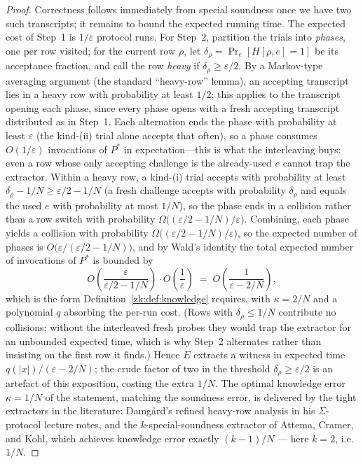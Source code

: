 \documentclass[11pt,a4paper]{article}
\theoremstyle{definition}
\theoremstyle{remark}
\begin{document}
\begin{proof}
Correctness follows immediately from special soundness once we have two such transcripts; it remains to bound the expected running time. The expected cost of Step~1 is \(1/\varepsilon\) protocol runs. For Step~2, partition the trials into \emph{phases}, one per row visited; for the current row \(\rho\), let \(\delta_\rho = \Pr_e[H[\rho,e]=1]\) be its acceptance fraction, and call the row \emph{heavy} if \(\delta_\rho \ge \varepsilon/2\). By a Markov-type averaging argument (the standard ``heavy-row'' lemma), an accepting transcript lies in a heavy row with probability at least \(1/2\); this applies to the transcript opening each phase, since every phase opens with a fresh accepting transcript distributed as in Step~1. Each alternation ends the phase with probability at least \(\varepsilon\) (the kind-(ii) trial alone accepts that often), so a phase consumes \(O(1/\varepsilon)\) invocations of \(P^*\) in expectation---this is what the interleaving buys: even a row whose only accepting challenge is the already-used \(e\) cannot trap the extractor. Within a heavy row, a kind-(i) trial accepts with probability at least \(\delta_\rho - 1/N \ge \varepsilon/2 - 1/N\) (a fresh challenge accepts with probability \(\delta_\rho\) and equals the used \(e\) with probability at most \(1/N\)), so the phase ends in a collision rather than a row switch with probability \(\Omega\bigl((\varepsilon/2 - 1/N)/\varepsilon\bigr)\). Combining, each phase yields a collision with probability \(\Omega\bigl((\varepsilon/2 - 1/N)/\varepsilon\bigr)\), so the expected number of phases is \(O\bigl(\varepsilon/(\varepsilon/2 - 1/N)\bigr)\), and by Wald's identity the total expected number of invocations of \(P^*\) is bounded by
\[
  O\!\left(\frac{\varepsilon}{\varepsilon/2 - 1/N}\right) \cdot O\!\left(\frac{1}{\varepsilon}\right) \;=\; O\!\left(\frac{1}{\varepsilon - 2/N}\right),
\]
which is the form Definition~\ref{zk:def:knowledge} requires, with \(\kappa = 2/N\) and a polynomial \(q\) absorbing the per-run cost. (Rows with \(\delta_\rho \le 1/N\) contribute no collisions; without the interleaved fresh probes they would trap the extractor for an unbounded expected time, which is why Step~2 alternates rather than insisting on the first row it finds.) Hence \(E\) extracts a witness in expected time \(q(|x|)/(\varepsilon - 2/N)\); the crude factor of two in the threshold \(\delta_\rho \ge \varepsilon/2\) is an artefact of this exposition, costing the extra \(1/N\). The optimal knowledge error \(\kappa = 1/N\) of the statement, matching the soundness error, is delivered by the tight extractors in the literature: Damg\aa rd's refined heavy-row analysis in his \(\Sigma\)-protocol lecture notes, and the \(k\)-special-soundness extractor of Attema, Cramer, and Kohl, which achieves knowledge error exactly \((k-1)/N\) --- here \(k = 2\), i.e.\ \(1/N\).
\end{proof}
\end{document}
